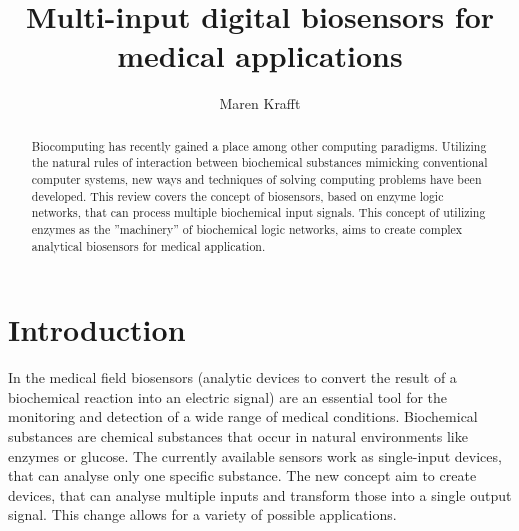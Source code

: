 \documentclass[runningheads]{llncs}
\begin{document}
\pagestyle{empty}
\title{Multi-input digital biosensors for medical applications}
\author{Maren Krafft}
\maketitle        

      
\begin{abstract}
Biocomputing has recently gained a place among other computing paradigms. Utilizing the natural rules of interaction between biochemical substances mimicking conventional computer systems, new ways and techniques of solving computing problems have been developed. This review covers the concept of biosensors, based on enzyme logic networks, that can process multiple biochemical input signals. This concept of utilizing enzymes as the ''machinery'' of biochemical logic networks, aims to create complex analytical biosensors for medical application.


\end{abstract}


\section{Introduction}

	In the medical field biosensors (analytic devices to convert the result of a biochemical reaction into an electric signal) are an essential tool for the monitoring and detection of a wide range of medical conditions. Biochemical substances are chemical substances that occur in natural environments like enzymes or glucose. The currently available sensors work as single-input devices, that can analyse only one specific substance. The new concept aim to create devices, that can analyse multiple inputs and transform those into a single output signal. This change allows for a variety of possible applications. \cite{biosensors,definitions}\\
	
\end{document}
